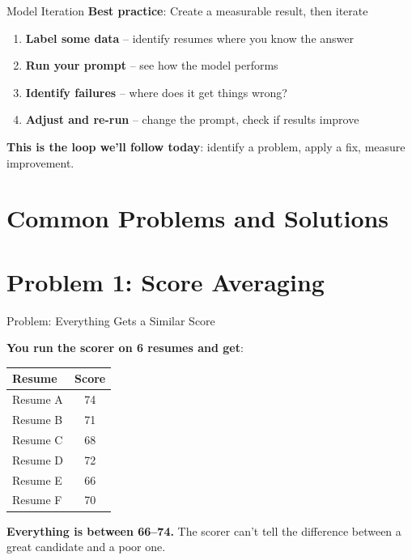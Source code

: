 \documentclass[aspectratio=169]{beamer}
\begin{document}
\begin{frame}{Model Iteration}
\textbf{Best practice}: Create a measurable result, then iterate
\vspace{0.3cm}

\begin{enumerate}
\item \textbf{Label some data} -- identify resumes where you know the answer
\item \textbf{Run your prompt} -- see how the model performs
\item \textbf{Identify failures} -- where does it get things wrong?
\item \textbf{Adjust and re-run} -- change the prompt, check if results improve
\end{enumerate}
\vspace{0.3cm}

\textbf{This is the loop we'll follow today}: identify a problem, apply a fix, measure improvement.
\end{frame}

\section{Common Problems and Solutions}

\section{Problem 1: Score Averaging}

\begin{frame}{Problem: Everything Gets a Similar Score}

\textbf{You run the scorer on 6 resumes and get}:
\vspace{0.3cm}

\begin{center}
\begin{tabular}{l c}
\textbf{Resume} & \textbf{Score} \\
\hline
Resume A & 74 \\
Resume B & 71 \\
Resume C & 68 \\
Resume D & 72 \\
Resume E & 66 \\
Resume F & 70 \\
\end{tabular}
\end{center}
\vspace{0.3cm}

\textbf{Everything is between 66--74.} The scorer can't tell the difference between a great candidate and a poor one.
\end{frame}
\end{document}
